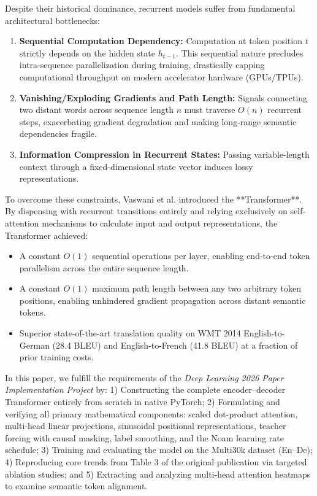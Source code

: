 \documentclass[conference]{IEEEtran}
\begin{document}
Despite their historical dominance, recurrent models suffer from fundamental architectural bottlenecks:
\begin{enumerate}
    \item \textbf{Sequential Computation Dependency:} Computation at token position $t$ strictly depends on the hidden state $h_{t-1}$. This sequential nature precludes intra-sequence parallelization during training, drastically capping computational throughput on modern accelerator hardware (GPUs/TPUs).
    \item \textbf{Vanishing/Exploding Gradients and Path Length:} Signals connecting two distant words across sequence length $n$ must traverse $O(n)$ recurrent steps, exacerbating gradient degradation and making long-range semantic dependencies fragile.
    \item \textbf{Information Compression in Recurrent States:} Passing variable-length context through a fixed-dimensional state vector induces lossy representations.
\end{enumerate}

To overcome these constraints, Vaswani et al. \cite{vaswani2017attention} introduced the **Transformer**. By dispensing with recurrent transitions entirely and relying exclusively on self-attention mechanisms to calculate input and output representations, the Transformer achieved:
\begin{itemize}
    \item A constant $O(1)$ sequential operations per layer, enabling end-to-end token parallelism across the entire sequence length.
    \item A constant $O(1)$ maximum path length between any two arbitrary token positions, enabling unhindered gradient propagation across distant semantic tokens.
    \item Superior state-of-the-art translation quality on WMT 2014 English-to-German (28.4 BLEU) and English-to-French (41.8 BLEU) at a fraction of prior training costs.
\end{itemize}

In this paper, we fulfill the requirements of the \textit{Deep Learning 2026 Paper Implementation Project} by:
1) Constructing the complete encoder--decoder Transformer entirely from scratch in native PyTorch;
2) Formulating and verifying all primary mathematical components: scaled dot-product attention, multi-head linear projections, sinusoidal positional representations, teacher forcing with causal masking, label smoothing, and the Noam learning rate schedule;
3) Training and evaluating the model on the Multi30k dataset (En--De);
4) Reproducing core trends from Table 3 of the original publication via targeted ablation studies; and
5) Extracting and analyzing multi-head attention heatmaps to examine semantic token alignment.
\end{document}
